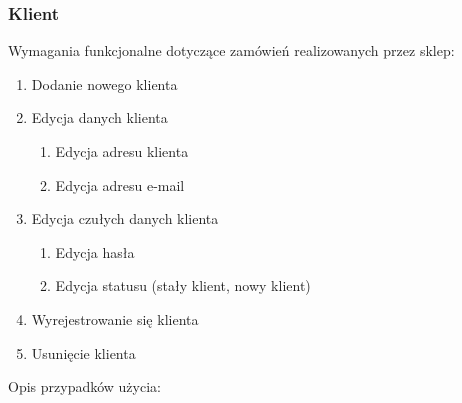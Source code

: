 \subsubsection{Klient}

Wymagania funkcjonalne dotyczące zamówień realizowanych przez sklep:


\begin{enumerate}
  \item Dodanie nowego klienta
  \item Edycja danych klienta
  \begin{enumerate}
    \item Edycja adresu klienta
    \item Edycja adresu e-mail
  \end{enumerate}
  \item Edycja czułych danych klienta
  \begin{enumerate}
    \item Edycja hasła
    \item Edycja statusu (stały klient, nowy klient)
  \end{enumerate}
  \item Wyrejestrowanie się klienta
  \item Usunięcie klienta
\end{enumerate}

Opis przypadków użycia: